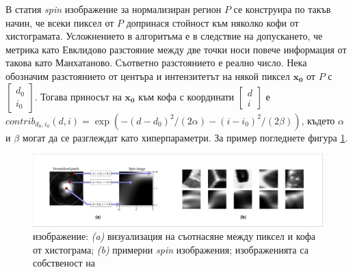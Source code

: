 \documentclass[a4paper,12pt]{article}
\begin{document}
\bigbreak

В статия \cite{spinimages} \textit{spin} изображение за нормализиран регион $P$ се конструира по такъв начин, че всеки пиксел от $P$ допринася стойност към няколко кофи от хистограмата. Усложнението в алгоритъма е в следствие на допускането, че метрика като Евклидово разстояние между две точки носи повече информация от такова като Манхатаново. Съответно разстоянието е реално число. Нека обозначим разстоянието от центъра и интензитетът на някой пиксел $\mathbf{x_0}$ от $P$ с $\begin{bmatrix} d_0 \\ i_0 \end{bmatrix}$. Тогава приносът на $\mathbf{x_0}$ към кофа с координати $\begin{bmatrix} d \\ i \end{bmatrix}$ е $contrib_{d_0,i_0}(d, i) = \exp(-(d-d_0)^2/(2\alpha) - (i-i_0)^2/(2\beta))$, където $\alpha$ и $\beta$ могат да се разглеждат като хиперпараметри. За пример погледнете фигура \ref{fig:spinim}.

\begin{figure}[h]
    \centering
    \includegraphics[width=\textwidth]{spin_image.png}
    \caption{ изображение: \textit{(a)} визуализация на съотнасяне между пиксел и кофа от хистограма; \textit{(b)} примерни \textit{spin} изображения; изображенията са собственост на \cite{spinimages}}
    \label{fig:spinim}
\end{figure}

\bigbreak
\end{document}
